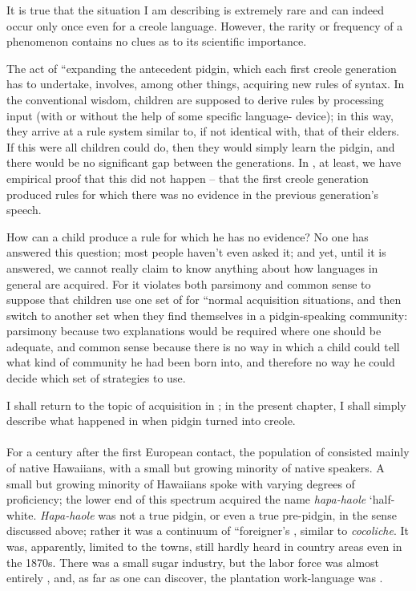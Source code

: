 
It is true that the situation I am describing is extremely rare and can indeed occur only once even for a creole language. However, the rarity or frequency of a phenomenon contains no clues as to its scientific importance.

The act of ``expanding the antecedent pidgin, which each
first creole generation has to undertake, involves, among other things, acquiring new rules of syntax. In the conventional wisdom, children are supposed to derive rules by processing input (with or without the help of some specific language- device);  in this way, they arrive at a rule system similar to, if not identical with, that of their elders. If this were all children could do, then they would simply learn the pidgin, and there would be no significant gap between the generations. In , at least, we have empirical proof that this did not happen -- that the first creole generation produced rules for which there was no evidence in the previous generation's speech.

How can a child produce a rule for which he has no evidence? No one has answered this question; most people haven't even asked it; and yet, until it is answered, we cannot really claim to know any\-thing about how languages in general are acquired. For it violates both parsimony and common sense to suppose that children use one set of  for ``normal acquisition situations, and then switch to another set when they find themselves in a pidgin-speaking community: parsimony because two explanations would be required where one should be adequate, and common sense because there is no way in which a child could tell what kind of community he had been born into, and therefore no way he could decide which
set of strategies to use.

I shall return to the topic of acquisition in ; in the present chapter, I shall simply describe what happened in  when pidgin turned into creole.\\\\

For a century after the first European contact, the population of  consisted mainly of native Hawaiians, with a small but growing minority of native  speakers. A small but growing
minority of Hawaiians spoke  with varying degrees of profi\-ciency; the lower end of this spectrum acquired the name \textit{hapa-haole} `half-white. \textit{Hapa-haole} was not a true pidgin, or even a true pre-pidgin, in the sense discussed above; rather it was a continuum of ``foreigner's , similar to   \textit{cocoliche}. It was, apparently, limited to the towns, still hardly heard in country areas even in the 1870s. There was a small sugar industry, but the labor force was almost entirely , and, as far as one can discover, the plantation work-language was .

